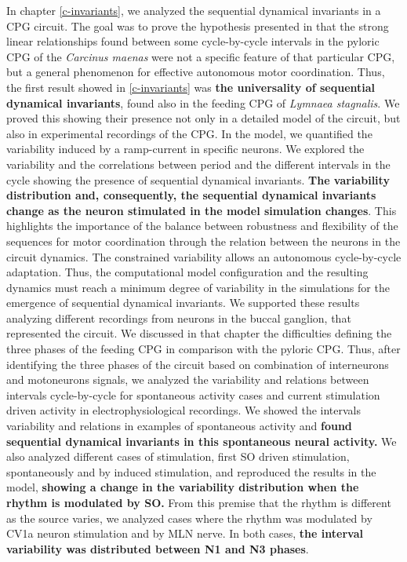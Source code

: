 	
In chapter \ref{c-invariants}, we analyzed the sequential dynamical invariants in a CPG circuit. The goal was to prove the hypothesis presented in \textcite{elices_robust_2019} that the strong linear relationships found between some cycle-by-cycle intervals in the pyloric CPG of the \textit{Carcinus maenas} were not a specific feature of that particular CPG, but a general phenomenon for effective autonomous motor coordination. Thus, the first result showed in \ref{c-invariants} was \textbf{the universality of sequential dynamical invariants}, found also in the feeding CPG of \textit{Lymnaea stagnalis}. We proved this showing their presence not only in a detailed model of the circuit, but also in experimental recordings of the CPG. In the model, we quantified the variability induced by a ramp-current in specific neurons. We explored the variability and the correlations between period and the different intervals in the cycle showing the presence of sequential dynamical invariants.  \textbf{The variability distribution and, consequently, the sequential dynamical invariants change as the neuron stimulated in the model simulation changes}. This highlights the importance of the balance between robustness and flexibility of the sequences for motor coordination through the relation between the neurons in the circuit dynamics. The constrained variability allows an autonomous cycle-by-cycle adaptation. Thus, the computational model configuration and the resulting dynamics must reach a minimum degree of variability in the simulations for the emergence of sequential dynamical invariants. We supported these results analyzing different recordings from neurons in the buccal ganglion, that represented the circuit. We discussed in that chapter the difficulties defining the three phases of the feeding CPG in comparison with the pyloric CPG. Thus, after identifying the three phases of the circuit based on combination of interneurons and motoneurons signals, we analyzed the variability and relations between intervals cycle-by-cycle for spontaneous activity cases and current stimulation driven activity in electrophysiological recordings. We showed the intervals variability and relations in examples of spontaneous activity and \textbf{found sequential dynamical invariants in this spontaneous neural activity.} We also analyzed different cases of stimulation, first SO driven stimulation, spontaneously and by induced stimulation, and reproduced the results in the model, \textbf{showing a change in the variability distribution when the rhythm is modulated by SO.} From this premise that the rhythm is different as the source varies, we analyzed cases where the rhythm was modulated by CV1a neuron stimulation and by MLN nerve. In both cases, \textbf{the interval variability was distributed between N1 and N3 phases}.

